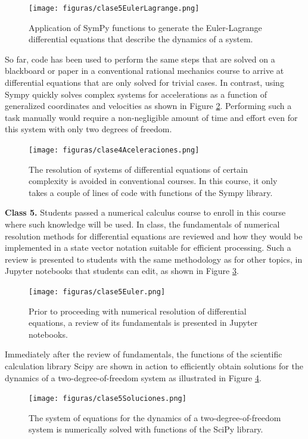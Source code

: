 \begin{figure}[!ht]
\centering
\texttt{[image: figuras/clase5EulerLagrange.png]}
\caption{Application of SymPy functions to generate the Euler-Lagrange differential equations that describe the dynamics of a system.}
\label{fig:clase4euler}
\end{figure}

So far, code has been used to perform the same steps that are solved on a blackboard or paper in a conventional rational mechanics course to arrive at differential equations that are only solved for trivial cases. In contrast, using Sympy quickly solves complex systems for accelerations as a function of generalized coordinates and velocities as shown in Figure \ref{fig:clase4ac}. Performing such a task manually would require a non-negligible amount of time and effort even for this system with only two degrees of freedom.

\begin{figure}[!ht]
\centering
\texttt{[image: figuras/clase4Aceleraciones.png]}
\caption{The resolution of systems of differential equations of certain complexity is avoided in conventional courses. In this course, it only takes a couple of lines of code with functions of the Sympy library.}
\label{fig:clase4ac}
\end{figure}

\textbf{Class 5.} Students passed a numerical calculus course to enroll in this course where such knowledge will be used. In class, the fundamentals of numerical resolution methods for differential equations are reviewed and how they would be implemented in a state vector notation suitable for efficient processing. Such a review is presented to students with the same methodology as for other topics, in Jupyter notebooks that students can edit, as shown in Figure \ref{fig:clase5res}.

\begin{figure}[!ht]
\centering
\texttt{[image: figuras/clase5Euler.png]}
\caption{Prior to proceeding with numerical resolution of differential equations, a review of its fundamentals is presented in Jupyter notebooks.}
\label{fig:clase5res}
\end{figure}

Immediately after the review of fundamentals, the functions of the scientific calculation library Scipy are shown in action to efficiently obtain solutions for the dynamics of a two-degree-of-freedom system as illustrated in Figure \ref{fig:clase5sol}.

\begin{figure}[!ht]
\centering
\texttt{[image: figuras/clase5Soluciones.png]}
\caption{The system of equations for the dynamics of a two-degree-of-freedom system is numerically solved with functions of the SciPy library.}
\label{fig:clase5sol}
\end{figure}


